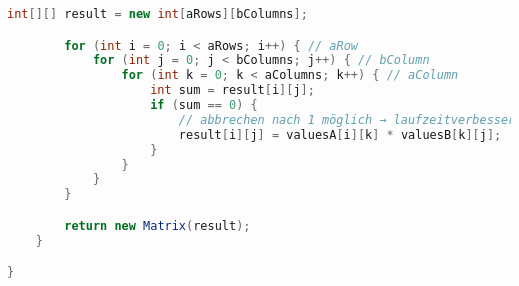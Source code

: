 \begin{lstlisting}[language=Java,label={lst:sourcecode}]
        int[][] result = new int[aRows][bColumns];

        for (int i = 0; i < aRows; i++) { // aRow
            for (int j = 0; j < bColumns; j++) { // bColumn
                for (int k = 0; k < aColumns; k++) { // aColumn
                    int sum = result[i][j];
                    if (sum == 0) {
                        // abbrechen nach 1 möglich → laufzeitverbesserung
                        result[i][j] = valuesA[i][k] * valuesB[k][j];
                    }
                }
            }
        }

        return new Matrix(result);
    }

}
\end{lstlisting}
